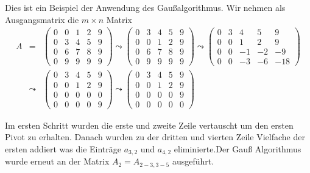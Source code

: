 Dies ist ein Beispiel der Anwendung des Gaußalgorithmus.
Wir nehmen als  Ausgangsmatrix die $m\times n$ Matrix 
\begin{eqnarray*}
A&=&\begin{pmatrix}
0 & 0 & 1 & 2 & 9 \\ 
0 & 3 & 4 & 5 & 9 \\ 
0 & 6 & 7 & 8 & 9 \\ 
0 & 9 & 9 & 9 & 9
\end{pmatrix} 
\leadsto
\begin{pmatrix}
0 & 3 & 4 & 5 & 9 \\ 
0 & 0 & 1 & 2 & 9 \\ 
0 & 6 & 7 & 8 & 9 \\ 
0 & 9 & 9 & 9 & 9
\end{pmatrix}
\leadsto 
\begin{pmatrix}
 0 & 3 & 4 & 5 & 9 \\ 
 0 & 0 & 1 & 2 & 9 \\ 
 0 & 0 & -1 & -2 & -9 \\ 
 0 & 0 & -3 & -6 & -18
\end{pmatrix}\\
&\leadsto &
\begin{pmatrix}
  0 & 3 & 4 & 5 & 9 \\ 
  0 & 0 & 1 & 2 & 9 \\ 
  0 & 0 & 0 & 0 & 0 \\ 
  0 & 0 & 0 & 0 & 9
  \end{pmatrix}
\leadsto
\begin{pmatrix}
  0 & 3 & 4 & 5 & 9 \\ 
  0 & 0 & 1 & 2 & 9 \\ 
  0 & 0 & 0 & 0 & 9 \\ 
  0 & 0 & 0 & 0 & 0
 \end{pmatrix}  
 \end{eqnarray*}
 
 Im ersten Schritt wurden die erste und zweite Zeile vertauscht um den ersten Pivot zu erhalten.
 Danach wurden zu der dritten und vierten Zeile Vielfache der ersten addiert was die Einträge $a_{3,2}$ und $a_{4,2}$ eliminierte.Der Gauß Algorithmus wurde erneut an der Matrix $A_2=A_{2-3,3-5}$ ausgeführt. 
